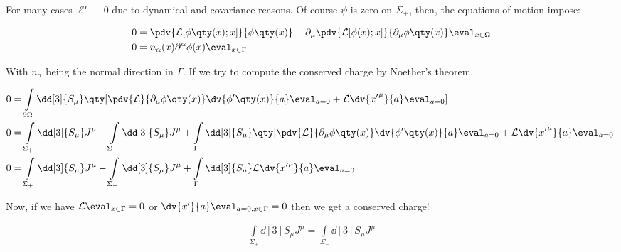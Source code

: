 For many cases $\ell^\alpha\equiv0$ due to dynamical and covariance reasons. Of course $\psi$ is zero on $\Sigma_\pm$, then, the equations of motion impose:

\begin{align}
    0&=\pdv{\mathcal L[\phi\qty(x);x]}{\phi\qty(x)}-\partial_\mu\pdv{\mathcal L[\phi(x);x]}{\partial_\mu\phi\qty(x)}\eval_{x\in\Omega}\\
    0&=n_\alpha(x)\partial^\alpha\phi(x)\eval_{x\in\Gamma}
\end{align}

With $n_\alpha$ being the normal direction in $\Gamma$. If we try to compute the conserved charge by Noether's theorem,

\begin{align}
    0&=\int\limits_{\partial\Omega}\dd[3]{S_\mu}\qty[\pdv{\mathcal L}{\partial_\mu\phi\qty(x)}\dv{\phi'\qty(x)}{a}\eval_{a=0}+\mathcal L\dv{{x'}^\mu}{a}\eval_{a=0}]\\
    0&=\int\limits_{\Sigma_+}\dd[3]{S_\mu}J^\mu-\int\limits_{\Sigma_-}\dd[3]{S_\mu}J^\mu+\int\limits_{\Gamma}\dd[3]{S_\mu}\qty[\pdv{\mathcal L}{\partial_\mu\phi\qty(x)}\dv{\phi'\qty(x)}{a}\eval_{a=0}+\mathcal L\dv{{x'}^\mu}{a}\eval_{a=0}]\\
    0&=\int\limits_{\Sigma_+}\dd[3]{S_\mu}J^\mu-\int\limits_{\Sigma_-}\dd[3]{S_\mu}J^\mu+\int\limits_{\Gamma}\dd[3]{S_\mu}\mathcal L\dv{{x'}^\mu}{a}\eval_{a=0}
\end{align}

Now, if we have $\mathcal L\eval_{x\in\Gamma} =0 $ or $\dv{x'}{a}\eval_{a=0,x\in\Gamma}=0$ then we get a conserved charge!

\begin{align}
    \int\limits_{\Sigma_+}\dd[3]{S_\mu}J^\mu=\int\limits_{\Sigma_-}\dd[3]{S_\mu}J^\mu
\end{align}





